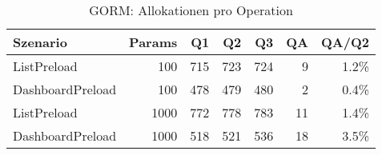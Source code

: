 \begin{table}[ht]
\centering
\caption{GORM: Allokationen pro Operation}
\begin{tabular}{lrrrrrr}
\toprule
Szenario & Params & Q1 & Q2 & Q3 & QA & QA/Q2 \\
\midrule
		ListPreload & 100 & 715 & 723 & 724 & 9 & 1.2\% \\
		DashboardPreload & 100 & 478 & 479 & 480 & 2 & 0.4\% \\
		ListPreload & 1000 & 772 & 778 & 783 & 11 & 1.4\% \\
		DashboardPreload & 1000 & 518 & 521 & 536 & 18 & 3.5\% \\
\bottomrule
\end{tabular}
\label{tab:benchmark_gorm_allocsperop}
\end{table}
	